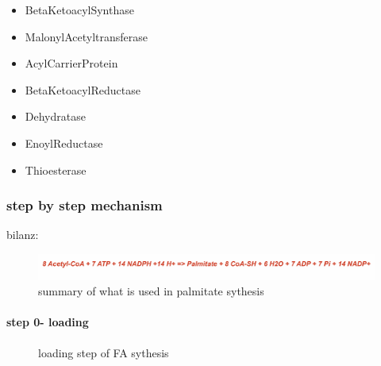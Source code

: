 \documentclass[../main.tex]{subfiles}
\begin{document}
\begin{itemize}
    \item \gls{BetaKetoacylSynthase} 
    \item \gls{MalonylAcetyltransferase} 
    \item \gls{AcylCarrierProtein}
    \item \gls{BetaKetoacylReductase} 
    \item \gls{Dehydratase}
    \item \gls{EnoylReductase} 
    \item \gls{Thioesterase} 
\end{itemize} 

\subsubsection{step by step mechanism}

bilanz:
\begin{figure}[H]
    \centering
    \includegraphics[width=1\linewidth]{bilanz.png}
    \caption{summary of what is used in palmitate sythesis}
    \label{fig:enter-label}
\end{figure}

\paragraph{step 0- loading}
\begin{figure}[H]
	\centering
	\caption{loading step of FA sythesis}
\end{figure}
\end{document}
